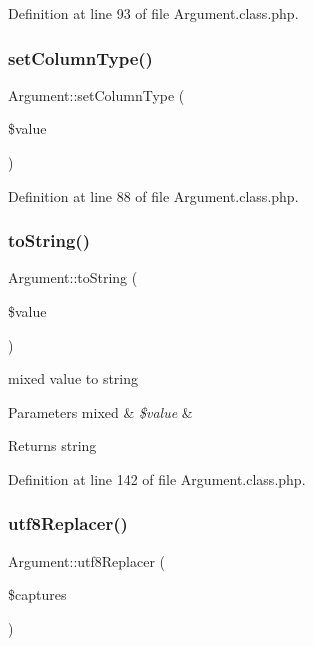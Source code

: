 Definition at line 93 of file Argument.\+class.\+php.

\mbox{\label{classArgument_a849c6abe0d16f2fdf21c38db6844bd9d}} 
\subsubsection{\texorpdfstring{set\+Column\+Type()}{setColumnType()}}
{\footnotesize\ttfamily Argument\+::set\+Column\+Type (\begin{DoxyParamCaption}\item[{}]{\$value }\end{DoxyParamCaption})}



Definition at line 88 of file Argument.\+class.\+php.

\mbox{\label{classArgument_a6fa3a8b473d05a02c7746a143e51ef81}} 
\subsubsection{\texorpdfstring{to\+String()}{toString()}}
{\footnotesize\ttfamily Argument\+::to\+String (\begin{DoxyParamCaption}\item[{}]{\$value }\end{DoxyParamCaption})}

mixed value to string 
\begin{DoxyParams}[1]{Parameters}
mixed & {\em \$value} & \\
\hline
\end{DoxyParams}
\begin{DoxyReturn}{Returns}
string 
\end{DoxyReturn}


Definition at line 142 of file Argument.\+class.\+php.

\mbox{\label{classArgument_aaf7f8b67195ed2e1b404339d107d6a1c}} 
\subsubsection{\texorpdfstring{utf8\+Replacer()}{utf8Replacer()}}
{\footnotesize\ttfamily Argument\+::utf8\+Replacer (\begin{DoxyParamCaption}\item[{}]{\$captures }\end{DoxyParamCaption})}



